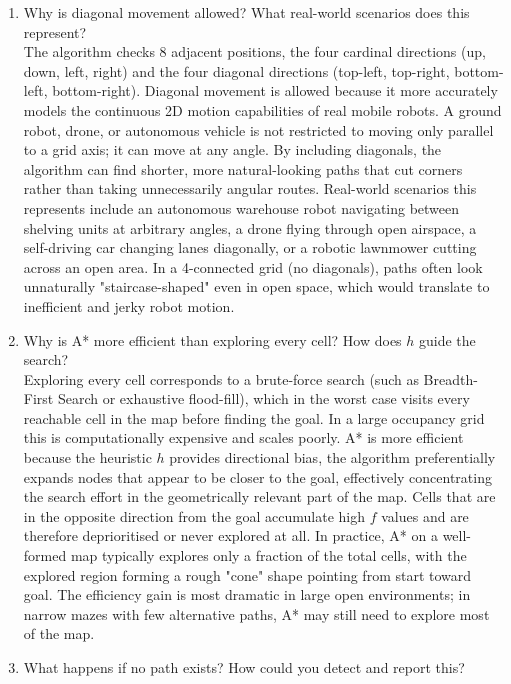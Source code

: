 \documentclass[11 pt , a 4 paper ]{article}
\theoremstyle{definition}
\begin{document}
\begin{enumerate}
   \item Why is diagonal movement allowed? What real-world scenarios does this represent?\\ 
     \newline \noindent The algorithm checks 8 adjacent positions, the four cardinal directions (up, down, left, right) and the four diagonal directions (top-left, top-right, bottom-left, bottom-right). Diagonal movement is allowed because it more accurately models the continuous 2D motion capabilities of real mobile robots. A ground robot, drone, or autonomous vehicle is not restricted to moving only parallel to a grid axis; it can move at any angle. By including diagonals, the algorithm can find shorter, more natural-looking paths that cut corners rather than taking unnecessarily angular routes. Real-world scenarios this represents include an autonomous warehouse robot navigating between shelving units at arbitrary angles, a drone flying through open airspace, a self-driving car changing lanes diagonally, or a robotic lawnmower cutting across an open area. In a 4-connected grid (no diagonals), paths often look unnaturally "staircase-shaped" even in open space, which would translate to inefficient and jerky robot motion.
   \item Why is A* more efficient than exploring every cell? How does $h$ guide the search?\\ 
     \newline \noindent Exploring every cell corresponds to a brute-force search (such as Breadth-First Search or exhaustive flood-fill), which in the worst case visits every reachable cell in the map before finding the goal. In a large occupancy grid this is computationally expensive and scales poorly. A* is more efficient because the heuristic $h$ provides directional bias, the algorithm preferentially expands nodes that appear to be closer to the goal, effectively concentrating the search effort in the geometrically relevant part of the map. Cells that are in the opposite direction from the goal accumulate high $f$ values and are therefore deprioritised or never explored at all. In practice, A* on a well-formed map typically explores only a fraction of the total cells, with the explored region forming a rough "cone" shape pointing from start toward goal. The efficiency gain is most dramatic in large open environments; in narrow mazes with few alternative paths, A* may still need to explore most of the map.
   \item What happens if no path exists? How could you detect and report this?\\ 

\end{enumerate}
\end{document}
